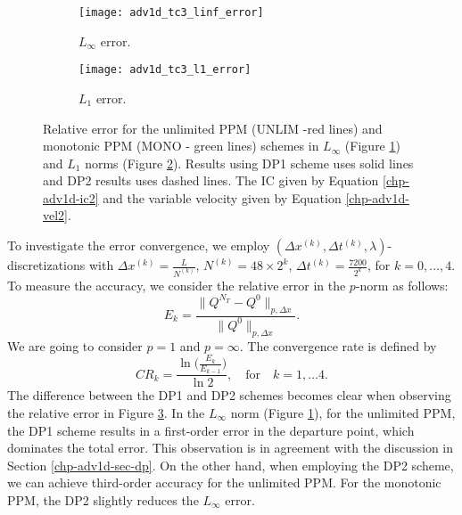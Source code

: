 \begin{figure}[!htb]
	\centering
	\begin{subfigure}{0.45\textwidth}
		\centering
		\texttt{[image: adv1d\_tc3\_linf\_error]}
		\caption{$L_{\infty}$ error.\label{chp-adv1d-sec-exp-adv2-error-linf}}
	\end{subfigure}
	\begin{subfigure}{0.45\textwidth}
		\centering
		\texttt{[image: adv1d\_tc3\_l1\_error]}
		\caption{$L_1$ error.\label{chp-adv1d-sec-exp-adv2-error-l1}}
	\end{subfigure}
	\caption{Relative error for the unlimited PPM (UNLIM -red lines) and monotonic PPM (MONO - green lines) schemes
	         in $L_{\infty}$
	         (Figure \ref{chp-adv1d-sec-exp-adv2-error-linf})
	         and $L_1$ norms
                 (Figure \ref{chp-adv1d-sec-exp-adv2-error-l1}).
	        Results using DP1 scheme uses solid lines and DP2 results uses dashed lines.
		The IC given by Equation
		\eqref{chp-adv1d-ic2} and the variable 
		velocity given by Equation \eqref{chp-adv1d-vel2}.\label{chp-adv1d-sec-exp-adv2-2}}
\end{figure}

To investigate the error convergence, we employ $(\Delta x^{(k)}, \Delta t^{(k)}, \lambda)$-discretizations with $\Delta x^{(k)} = \frac{L}{N^{(k)}}$,
$N^{(k)} = 48 \times 2^k$,
$\Delta t^{(k)}=\frac{7200}{{2^{k}}}$, for $k = 0, \ldots, 4$.
To measure the accuracy, we consider the relative error in the $p$-norm as follows:
\begin{equation*}
	E_k = 
	\frac{\| Q^{N_T} - Q^0 \|_{p, \Delta x}}{\|Q^0\|_{p, \Delta x}}.
\end{equation*}
We are going to consider $p=1$ and $p=\infty$.
The convergence rate is defined by
\begin{equation*}
	CR_k = \frac{\ln{\bigg(\frac{E_{k}}{E_{k-1}}}\bigg)}{\ln 2}, \quad \text{for} \quad k = 1, \ldots 4.
\end{equation*}
The difference between the DP1 and DP2 schemes becomes clear when observing the relative error in Figure \ref{chp-adv1d-sec-exp-adv2-2}.
In the $L_{\infty}$ norm (Figure \ref{chp-adv1d-sec-exp-adv2-error-linf}), 
for  the unlimited PPM, the DP1 scheme results in a first-order error in the departure point, which dominates the total error.
This observation is in agreement with the discussion in Section \ref{chp-adv1d-sec-dp}.
On the other hand, when employing the DP2 scheme, we can achieve third-order accuracy for the unlimited PPM.
For the monotonic PPM, the DP2 slightly reduces the $L_{\infty}$ error.


